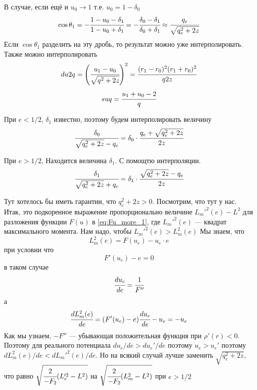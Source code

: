 	В случае, если ещё и $u_0 \rightarrow 1$ т.е. $u_0 = 1 - \delta_0$
	\begin{equation*}
		\cos {\theta_1} = -\cfrac{1-u_0-\delta_1}{1-u_0+\delta_1} = 
		-\cfrac{\delta_0-\delta_1}{\delta_0+\delta_1}
		\approx \cfrac{q_e}{\sqrt{q_e^2 + 2z}}
	\end{equation*}
	Если $\cos {\theta_1}$ разделить на эту дробь, то результат можно уже интерполировать.
	Также можно интерполировать 
	\begin{equation*}
		du2q = \left(\cfrac{u_1-u_0}{\sqrt{q^2+2z}}\right)^2 = \cfrac{(r_1-r_0)^2(r_1+r_0)^2}{q2z}
	\end{equation*}
	\begin{equation*}
		suq = \cfrac{u_1+u_0 - 2}{q}
	\end{equation*}
	
	При $e < 1/2$, $\delta_1$ известно, поэтому будем интерполировать величину
	\begin{equation*}
		\cfrac{\delta_0}{\sqrt{q_e^2+2z} - q_e} = 
		\delta_0\cdot\cfrac{q_e+\sqrt{q_e^2+2z}}{2z}
	\end{equation*}
	
	При $e > 1/2$, Находится величина $\delta_1$. С помощтю интерполяции.
	\begin{equation*}
		\cfrac{\delta_1}{\sqrt{q_e^2+2z} + q_e} = 
		\delta_1\cdot\cfrac{\sqrt{q_e^2+2z }- q_e}{2z}
	\end{equation*}
	
	Тут хотелось бы иметь гарантии, что $q_e^2 + 2z > 0$. Посмотрим, что тут у нас. Итак, это подкоренное выражение пропорционально величине $L_m'^2(e) - L^2$ для разложения функции $F(u)$ в \ref{eq:Fu_more_1}, где $L_m'^2(e)$ --- квадрат максимального момента. Нам надо, чтобы $L_m'^2(e) > L_m^2(e)$ Мы знаем, что
	\begin{equation*}
		 L_m^2(e) = F(u_e) - u_e \cdot e
	\end{equation*}
	при условии что 
	\begin{equation*}
		F'(u_e) - e = 0
	\end{equation*}
	в таком случае
	\begin{equation*}
		\cfrac{du_e}{de} = \cfrac{1}{F''}
	\end{equation*}
	а
	\begin{equation*}
		\cfrac{dL_m^2(e)}{de} = (F'(u_e) - e) \cfrac{du_e}{de} - u_e = -u_e
	\end{equation*}
	Как мы узнаем, $-F''$ --- убывающая положительная функция при $\rho'(r) < 0$. Поэтому для реального потенциала $du_e/de > du_e'/de$ поэтому $u_e > u_e'$ поэтому $dL_m^2(e)/de < dL_m'^2(e)/de$. 
	Но на всякий случай лучше заменить $\sqrt{q_e^2+2z}$, что равно $\sqrt{\cfrac{2}{-F_2}(L_e'^2-L^2)}$ на $\sqrt{\cfrac{2}{-F_2}(L_m^2-L^2)}$ при $e > 1/2$
	
